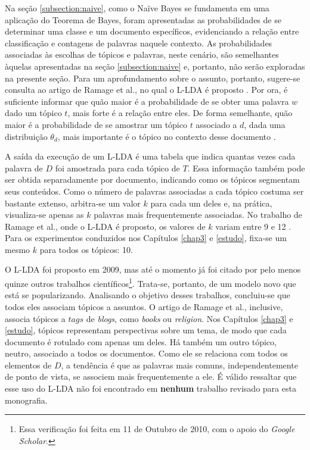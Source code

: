 Na seção \ref{subsection:naive}, como o Naïve Bayes se fundamenta em uma aplicação do Teorema de Bayes, foram apresentadas as probabilidades de se determinar uma classe e um documento específicos, evidenciando a relação entre classificação e contagens de palavras naquele contexto. As probabilidades associadas às escolhas de tópicos e palavras, neste cenário, são semelhantes àquelas apresentadas na seção \ref{subsection:naive} e, portanto, não serão exploradas na presente seção. Para um aprofundamento sobre o assunto, portanto, sugere-se consulta ao artigo de Ramage et al., no qual o L-LDA é proposto \cite{llda}. Por ora, é suficiente informar que quão maior é a probabilidade de se obter uma palavra \ensuremath{w} dado um tópico \ensuremath{t}, mais forte é a relação entre eles. De forma semelhante, quão maior é a probabilidade de se amostrar um tópico \ensuremath{t} associado a \ensuremath{d}, dada uma distribuição \ensuremath{\theta_d}, mais importante é o tópico no contexto desse documento \cite{pnas}.

A saída da execução de um L-LDA é uma tabela que indica quantas vezes cada palavra de \ensuremath{D} foi amostrada para cada tópico de \ensuremath{T}. Essa informação também pode ser obtida separadamente por documento, indicando como os tópicos segmentam seus conteúdos. Como o número de palavras associadas a cada tópico costuma ser bastante extenso, arbitra-se um valor \ensuremath{k} para cada um deles e, na prática, visualiza-se apenas as \ensuremath{k} palavras mais frequentemente associadas. No trabalho de Ramage et al., onde o L-LDA é proposto, os valores de \ensuremath{k} variam entre 9 e 12 \cite{llda}. Para os experimentos conduzidos nos Capítulos \ref{chap3} e \ref{estudo}, fixa-se um mesmo \ensuremath{k} para todos os tópicos: 10.  

O L-LDA foi proposto em 2009, mas até o momento já foi citado por pelo menos quinze outros trabalhos científicos\footnote{Essa verificação foi feita em 11 de Outubro de 2010, com o apoio do \emph{Google Scholar}.}. Trata-se, portanto, de um modelo novo que está se popularizando. Analisando o objetivo desses trabalhos, concluiu-se que todos eles associam tópicos a assuntos. O artigo de Ramage et al., inclusive, associa tópicos a \ensuremath{tags} de \emph{blogs}, como \emph{books} ou \emph{religion}. Nos Capítulos \ref{chap3} e \ref{estudo}, tópicos representam perspectivas sobre um tema, de modo que cada documento é rotulado com apenas um deles. Há também um outro tópico, neutro, associado a todos os documentos. Como ele se relaciona com todos os elementos de \ensuremath{D}, a tendência é que as palavras mais comuns, independentemente de ponto de vista, se associem mais frequentemente a ele.  É válido ressaltar que esse uso do L-LDA não foi encontrado em \textbf{nenhum} trabalho revisado para esta monografia. 

